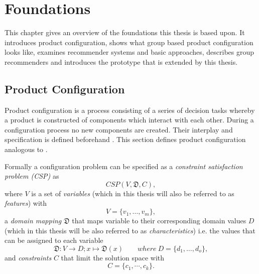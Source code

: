 \chapter{Foundations}
\label{ch:Foundations}

This chapter gives an overview of the foundations this thesis is based upon. It introduces product configuration, shows what group based product configuration looks like, examines recommender systems and basic approaches, describes group recommenders and introduces the prototype that is extended by this thesis.

\section{Product Configuration}
\label{sec:Foundations:ProductConfiguration}

Product configuration is a process consisting of a series of decision tasks whereby a product is constructed of components which interact with each other. During a configuration process no new components are created. Their interplay and specification is defined beforehand \cite[~ pp. 42, 43]{sabinProductConfigurationFrameworksa1998}. This section defines product configuration analogous to \citeauthor{felfernigOpenConfiguration2014} \cite{felfernigOpenConfiguration2014}.

Formally a configuration problem can be specified as a \emph{constraint satisfaction problem (CSP)} \cite{tsangFoundationsConstraintSatisfaction1993} as 
\begin{equation} \label{eq:Foundations:ProductConfiguration:ConstraintSatisfactionProblem}
    CSP(V,\mathfrak{D},C),
\end{equation}
where $V$ is a set of \emph{variables} (which in this thesis will also be referred to as \emph{features}) with
\begin{equation} \label{eq:Foundations:ProductConfiguration:Variables}
    V = \{v_1, \dotsc, v_m\},
\end{equation}
a \emph{domain mapping} $\mathfrak{D}$ that maps variable to their corresponding domain values $D$ (which in this thesis will be also referred to as \emph{characteristics}) i.e. the values that can be assigned to each variable
\begin{equation}\label{eq:Foundations:ProductConfiguration:DomainMapping}
    \mathfrak{D} : V \to D; x \mapsto \mathfrak{D}(x) \qquad where \ D = \{d_1, \dotsc, d_o\},
\end{equation}
and \emph{constraints} $C$ that limit the solution space with 
\begin{equation}\label{eq:Foundations:ProductConfiguration:Constraints}
    C = \{c_1, \cdots, c_k\}.
\end{equation}

